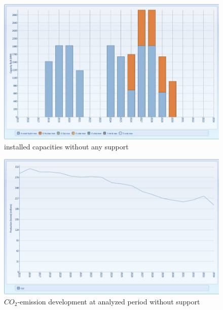\documentclass{article}
\begin{document}
\begin{figure}[htbp]
\begin{center}
\includegraphics[width=13cm,keepaspectratio=true]{figures/capacitywithout}
\caption{installed capacities without any support}
\label{fig:capacitywithout}
\end{center}
\end{figure}
\begin{figure}[htbp]
\begin{center}
\includegraphics[width=13cm,keepaspectratio=true]{figures/CO2without}
\caption{$CO_2$-emission development at analyzed period without support}
\label{fig:CO2without}
\end{center}
\end{figure}
\end{document}
